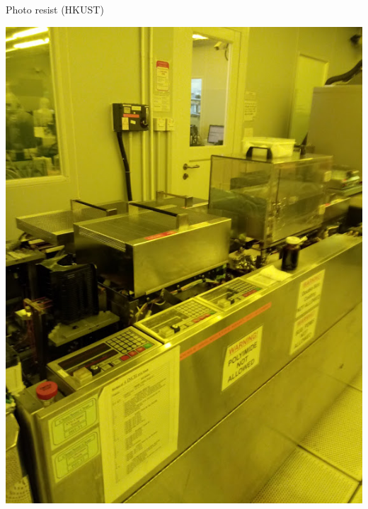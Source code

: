 \documentclass[aspectratio=169]{beamer}
\begin{document}
\begin{frame}{Photo resist (HKUST)}
\begin{center}
\includegraphics[height=0.8\textheight]{images/20181128_154907.jpg}

\end{center}
\end{frame}
\end{document}
